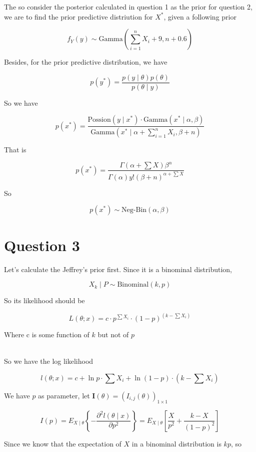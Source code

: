 \documentclass[12pt]{article}
\begin{document}
\begin{flushleft}
\qquad The so consider the posterior calculated in question 1 as the prior for question 2, we are to find the prior predictive distriution for $X^{*}$, given a following prior

$$
f_{Y}(y) \sim \text{Gamma}(\sum_{i=1}^n X_i + 9, n+0.6)
$$

\qquad Besides, for the prior predictive distribution, we have

$$
p(y^{*}) = \frac{p(y\mid \theta)p(\theta)}{p(\theta\mid y)}
$$

\qquad So we have

$$
p(x^{*}) = \frac{\text{Possion}(y\mid x^{*})\cdot \text{Gamma}(x^{*}\mid \alpha, \beta)}{\text{Gamma}(x^{*}\mid \alpha + \sum_{i=1}^n X_i, \beta + n)}
$$

\qquad That is

$$
p(x^{*}) = \frac{\Gamma(\alpha + \sum X)\beta^{\alpha}}{\Gamma(\alpha)y!(\beta+n)^{\alpha + \sum X}}
$$

\qquad So

$$
p(x^{*}) \sim \text{Neg-Bin}(\alpha, \beta)
$$

\newpage

\section{Question 3}

\qquad Let's calculate the Jeffrey's prior first. Since it is a binominal distribution, 

$$
X_k \mid P \sim \text{Binominal}(k,p)
$$

\qquad So its likelihood should be 

$$
L(\theta; x) = c \cdot p^{\sum X_i} \cdot (1-p)^{(k - \sum X_i)}
$$

\qquad Where c is some function of $k$ but not of $p$

~\\

\qquad So we have the log likelihood

$$
l(\theta; x) = c +  \ln p \cdot \sum X_i + \ln (1-p) \cdot (k - \sum X_i) 
$$

\qquad We have $p$ as parameter, let $\bm{I}(\theta) = (I_{i,j}(\theta))_{1\times 1}$

$$
I(p) = E_{X\mid \theta}\left\{-\frac{\partial^2 l(\theta \mid x)}{\partial p^2} \right\} = E_{X\mid \theta} \left[ \frac{X}{p^2} + \frac{k - X}{(1-p)^2} \right]
$$

\qquad Since we know that the expectation of $X$ in a binominal distribution is $kp$, so


\end{flushleft}
\end{document}
